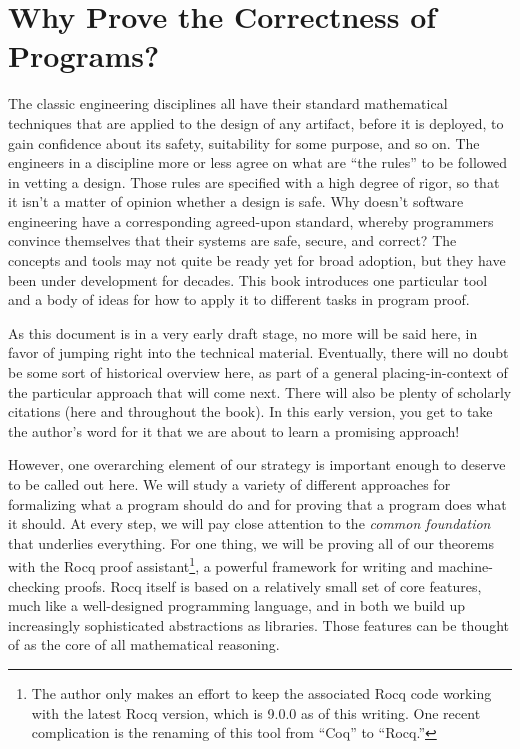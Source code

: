 \documentclass{amsbook}
\theoremstyle{definition}
\theoremstyle{remark}
\numberwithin{section}{chapter}
\numberwithin{equation}{chapter}
\begin{document}
\setcounter{page}{4}

\tableofcontents

\mainmatter


\chapter{Why Prove the Correctness of Programs?}

The classic engineering disciplines all have their standard mathematical techniques that are applied to the design of any artifact, before it is deployed, to gain confidence about its safety, suitability for some purpose, and so on.
The engineers in a discipline more or less agree on what are ``the rules'' to be followed in vetting a design.
Those rules are specified with a high degree of rigor, so that it isn't a matter of opinion whether a design is safe.
Why doesn't software engineering have a corresponding agreed-upon standard, whereby programmers convince themselves that their systems are safe, secure, and correct?
The concepts and tools may not quite be ready yet for broad adoption, but they have been under development for decades.
This book introduces one particular tool and a body of ideas for how to apply it to different tasks in program proof.

As this document is in a very early draft stage, no more will be said here, in favor of jumping right into the technical material.
Eventually, there will no doubt be some sort of historical overview here, as part of a general placing-in-context of the particular approach that will come next.
There will also be plenty of scholarly citations (here and throughout the book).
In this early version, you get to take the author's word for it that we are about to learn a promising approach!

However, one overarching element of our strategy is important enough to deserve to be called out here.
We will study a variety of different approaches for formalizing what a program should do and for proving that a program does what it should.
At every step, we will pay close attention to the \emph{common foundation} that underlies everything.
For one thing, we will be proving all of our theorems with the Rocq proof assistant\footnote{The author only makes an effort to keep the associated Rocq code working with the latest Rocq version, which is 9.0.0 as of this writing.  One recent complication is the renaming of this tool from ``Coq'' to ``Rocq.''}, a powerful framework for writing and machine-checking proofs.
Rocq itself is based on a relatively small set of core features, much like a well-designed programming language, and in both we build up increasingly sophisticated abstractions as libraries.
Those features can be thought of as the core of all mathematical reasoning.
\end{document}

